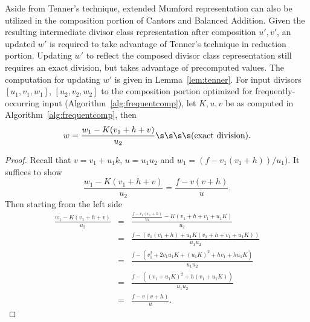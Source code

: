 Aside from Tenner's technique, extended Mumford representation can also be
utilized in the composition portion of Cantors and Balanced Addition. Given the
resulting intermediate divisor class representation after composition $u',v'$,
an updated $w'$ is required to take advantage of Tenner's technique in reduction
portion. Updating $w'$ to reflect the composed divisor class representation
still requires an exact division, but takes advantage of precomputed values. The
computation for updating $w'$ is given in Lemma~\ref{lem:tenner}.
\bl\label{lem:tenner}
For input divisors $[u_1,v_1,w_1]$, $[u_2,v_2,w_2]$ to the composition portion
optimized for frequently-occurring input (Algorithm~\ref{alg:frequentcomp}), let
$K,u,v$ be as computed in Algorithm~\ref{alg:frequentcomp}, then
$$ w = \frac{w_1 - K(v_1 + h + v)}{u_2} \s\s\s\s \mbox{(exact division)}.$$

\begin{proof}

    Recall that $v = v_1 + u_1k$, $u = u_1u_2$ and $w_1 = (f -
    v_1(v_1+h))/u_1)$. It suffices to show $$\frac{w_1 - K(v_1 + h + v)}{u_2} =
    \frac{f - v(v+h)}{u}.$$ Then starting from the left side
    \begin{eqnarray*} \frac{w_1 - K(v_1 + h + v)}{u_2} &=&  \frac{\frac{f -
    v_1(v_1+h)}{u_1} - K(v_1 + h + v_1 + u_1K)}{u_2}\\
    &=& \frac{f - (v_1(v_1+h) + u_1K(v_1 + h + v_1 + u_1K))}{u_1u_2}\\
    &=& \frac{f - (v_1^2 + 2v_1u_1K + (u_1K)^2 + hv_1  + hu_1K)}{u_1u_2}\\
    &=& \frac{f - ((v_1+u_1K)^2 + h(v_1 + u_1K))}{u_1u_2}\\
    &=& \frac{f - v(v + h)}{u}.
    \end{eqnarray*}
\end{proof}
\el


